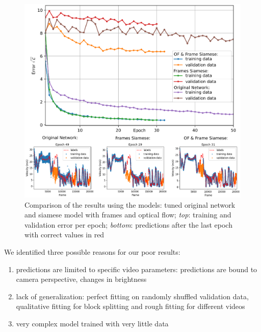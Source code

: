 \documentclass[conference]{IEEEtran}
\begin{document}
\begin{figure}[ht]
	\centering
	\includegraphics[width=0.99\columnwidth]{imgs/TrainingProcess.eps}
	\caption{Comparison of the results using the models: tuned original network and siamese model with frames and optical flow; \textit{top}: training and validation error per epoch; \textit{bottom}: predictions after the last epoch with correct values in red}
	\label{fig:resultsSummary}
\end{figure}

We identified three possible reasons for our poor results:
\begin{enumerate}[label=(\roman*)]
	\item predictions are limited to specific video parameters: predictions are bound to camera perspective, changes in brightness
	\item lack of generalization: perfect fitting on randomly shuffled validation data, qualitative fitting for block splitting and rough fitting for different videos
	\item very complex model trained with very little data
\end{enumerate}
\end{document}
